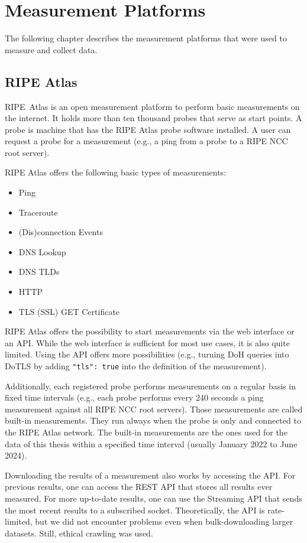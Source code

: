 \section{Measurement Platforms} \label{sec:measurement-platforms}

The following chapter describes the measurement platforms that were used to
measure and collect data.

\subsection{RIPE Atlas} \label{sec:ripe-atlas}

RIPE~Atlas is an open measurement platform to perform basic measurements on the
internet. It holds more than ten thousand probes that serve as start points. A
probe is machine that has the RIPE Atlas probe software installed. A user can
request a probe for a measurement (e.g., a ping from a probe to a RIPE NCC root
server).

RIPE Atlas offers the following basic types of measurements:

\begin{itemize}
	\item Ping
	\item Traceroute
	\item (Dis)connection Events
	\item DNS Lookup
	\item DNS TLDs
	\item HTTP
	\item TLS (SSL) GET Certificate
\end{itemize}

RIPE Atlas offers the possibility to start measurements via the web interface
or an API. While the web interface is sufficient for most use cases, it is also
quite limited. Using the API offers more possibilities (e.g., turning DoH
queries into DoTLS by adding \verb|"tls": true| into the definition of the
measurement).

Additionally, each registered probe performs measurements on a regular basis in
fixed time intervals (e.g., each probe performs every 240 seconds a ping
measurement against all RIPE NCC root servers). Those measurements are called
built-in measurements. They run always when the probe is only and connected to
the RIPE Atlas network. The built-in measurements are the ones used for the
data of this thesis within a specified time interval (usually January 2022 to
June 2024).

Downloading the results of a measurement also works by accessing the API. For
previous results, one can access the REST API that stores all results ever
measured. For more up-to-date results, one can use the Streaming API that sends
the most recent results to a subscribed socket. Theoretically, the API is
rate-limited, but we did not encounter problems even when bulk-downloading
larger datasets. Still, ethical crawling was used.

